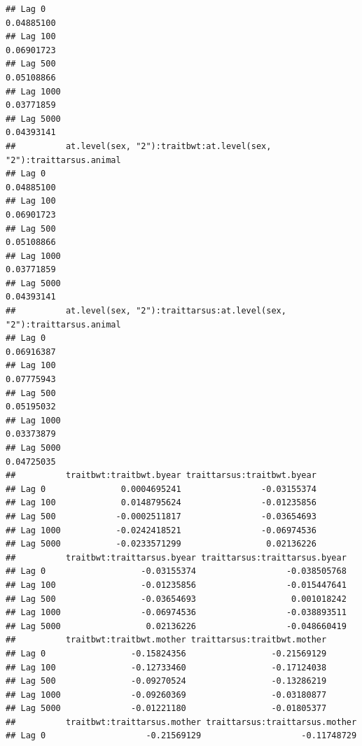 \documentclass[
  12pt,
]{book}
\begin{document}
\begin{verbatim}
## Lag 0                                                           0.04885100
## Lag 100                                                         0.06901723
## Lag 500                                                         0.05108866
## Lag 1000                                                        0.03771859
## Lag 5000                                                        0.04393141
##          at.level(sex, "2"):traitbwt:at.level(sex, "2"):traittarsus.animal
## Lag 0                                                           0.04885100
## Lag 100                                                         0.06901723
## Lag 500                                                         0.05108866
## Lag 1000                                                        0.03771859
## Lag 5000                                                        0.04393141
##          at.level(sex, "2"):traittarsus:at.level(sex, "2"):traittarsus.animal
## Lag 0                                                              0.06916387
## Lag 100                                                            0.07775943
## Lag 500                                                            0.05195032
## Lag 1000                                                           0.03373879
## Lag 5000                                                           0.04725035
##          traitbwt:traitbwt.byear traittarsus:traitbwt.byear
## Lag 0               0.0004695241                -0.03155374
## Lag 100             0.0148795624                -0.01235856
## Lag 500            -0.0002511817                -0.03654693
## Lag 1000           -0.0242418521                -0.06974536
## Lag 5000           -0.0233571299                 0.02136226
##          traitbwt:traittarsus.byear traittarsus:traittarsus.byear
## Lag 0                   -0.03155374                  -0.038505768
## Lag 100                 -0.01235856                  -0.015447641
## Lag 500                 -0.03654693                   0.001018242
## Lag 1000                -0.06974536                  -0.038893511
## Lag 5000                 0.02136226                  -0.048660419
##          traitbwt:traitbwt.mother traittarsus:traitbwt.mother
## Lag 0                 -0.15824356                 -0.21569129
## Lag 100               -0.12733460                 -0.17124038
## Lag 500               -0.09270524                 -0.13286219
## Lag 1000              -0.09260369                 -0.03180877
## Lag 5000              -0.01221180                 -0.01805377
##          traitbwt:traittarsus.mother traittarsus:traittarsus.mother
## Lag 0                    -0.21569129                    -0.11748729

\end{verbatim}
\end{document}
